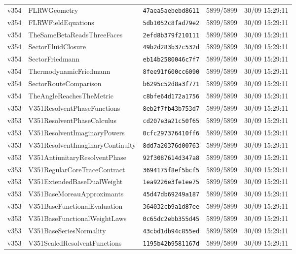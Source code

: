 \documentclass[11pt]{article}
\theoremstyle{definition}\newtheorem{deriv}{Derivation}
\begin{document}
{\begin{longtable}{@{}lllll@{}}
v354 & FLRWGeometry & \texttt{47aea5aebebd8611} & 5899/5899 & 30/09 15:29:11 \\
v354 & FLRWFieldEquations & \texttt{5db1052c8fad79e2} & 5899/5899 & 30/09 15:29:11 \\
v354 & TheSameBetaReadsThreeFaces & \texttt{2efd8b379f210111} & 5899/5899 & 30/09 15:29:11 \\
v354 & SectorFluidClosure & \texttt{49b2d283b37c532d} & 5899/5899 & 30/09 15:29:11 \\
v354 & SectorFriedmann & \texttt{eb14b2580046c7f7} & 5899/5899 & 30/09 15:29:11 \\
v354 & ThermodynamicFriedmann & \texttt{8fee91f600cc6090} & 5899/5899 & 30/09 15:29:11 \\
v354 & SectorRouteComparison & \texttt{b6295c52d8a3f771} & 5899/5899 & 30/09 15:29:11 \\
v354 & TheAngleReachesTheMetric & \texttt{c8bfe64d172a1756} & 5899/5899 & 30/09 15:29:11 \\
v353 & V351ResolventPhaseFunctions & \texttt{8eb2f7fb43b753d7} & 5899/5899 & 30/09 15:29:11 \\
v353 & V351ResolventPhaseCalculus & \texttt{cd207e3a21c50f65} & 5899/5899 & 30/09 15:29:11 \\
v353 & V351ResolventImaginaryPowers & \texttt{0cfc297376410ff6} & 5899/5899 & 30/09 15:29:11 \\
v353 & V351ResolventImaginaryContinuity & \texttt{8dd7a20376d00763} & 5899/5899 & 30/09 15:29:11 \\
v353 & V351AntiunitaryResolventPhase & \texttt{92f3087614d347a8} & 5899/5899 & 30/09 15:29:11 \\
v353 & V351RegularCoreTraceContract & \texttt{3694175f8ef5bcf5} & 5899/5899 & 30/09 15:29:11 \\
v353 & V351ExtendedBaseDualWeight & \texttt{1ea9226e3fe1ee75} & 5899/5899 & 30/09 15:29:11 \\
v353 & V351BaseMoreauApproximants & \texttt{45d47db69249a187} & 5899/5899 & 30/09 15:29:11 \\
v353 & V351BaseFunctionalEvaluation & \texttt{364032cb9a1d87ee} & 5899/5899 & 30/09 15:29:11 \\
v353 & V351BaseFunctionalWeightLaws & \texttt{0c65dc2ebb355d45} & 5899/5899 & 30/09 15:29:11 \\
v353 & V351BaseSeriesNormality & \texttt{43cbd1db94c855ed} & 5899/5899 & 30/09 15:29:11 \\
v353 & V351ScaledResolventFunctions & \texttt{1195b42b9581167d} & 5899/5899 & 30/09 15:29:11 \\

\end{longtable}}
\end{document}

